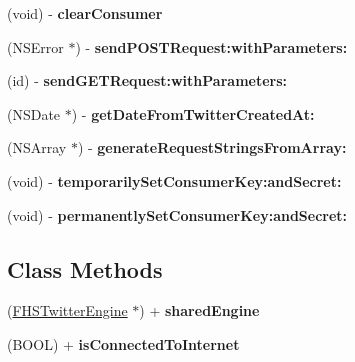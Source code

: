 \begin{DoxyCompactItemize}
\item 
\mbox{\label{interfaceFHSTwitterEngine_ad6e7947e9f2c6b1c6734e10c1e315b5b}} 
(void) -\/ {\bfseries clear\+Consumer}
\item 
\mbox{\label{interfaceFHSTwitterEngine_a1ba74271ffa2c349450f07c5fa12e207}} 
(N\+S\+Error $\ast$) -\/ {\bfseries send\+P\+O\+S\+T\+Request\+:with\+Parameters\+:}
\item 
\mbox{\label{interfaceFHSTwitterEngine_a11033253fc3b663730355be2e6947518}} 
(id) -\/ {\bfseries send\+G\+E\+T\+Request\+:with\+Parameters\+:}
\item 
\mbox{\label{interfaceFHSTwitterEngine_a32dbb92d645c6d5c05bf929903bd7d30}} 
(N\+S\+Date $\ast$) -\/ {\bfseries get\+Date\+From\+Twitter\+Created\+At\+:}
\item 
\mbox{\label{interfaceFHSTwitterEngine_a3a0d61913a8c4ab778630979a20bafc9}} 
(N\+S\+Array $\ast$) -\/ {\bfseries generate\+Request\+Strings\+From\+Array\+:}
\item 
\mbox{\label{interfaceFHSTwitterEngine_a826af0a28ffa1d2c8ec5b927fe2feeca}} 
(void) -\/ {\bfseries temporarily\+Set\+Consumer\+Key\+:and\+Secret\+:}
\item 
\mbox{\label{interfaceFHSTwitterEngine_aee6c528a6a21de0b2b4965642e208c79}} 
(void) -\/ {\bfseries permanently\+Set\+Consumer\+Key\+:and\+Secret\+:}
\end{DoxyCompactItemize}
\subsection*{Class Methods}
\begin{DoxyCompactItemize}
\item 
\mbox{\label{interfaceFHSTwitterEngine_aa4c332012ac6c784dabd0aa725cc28de}} 
(\hyperlink{interfaceFHSTwitterEngine}{F\+H\+S\+Twitter\+Engine} $\ast$) + {\bfseries shared\+Engine}
\item 
\mbox{\label{interfaceFHSTwitterEngine_a287ad271090756670226f23ed786691e}} 
(B\+O\+OL) + {\bfseries is\+Connected\+To\+Internet}
\end{DoxyCompactItemize}
